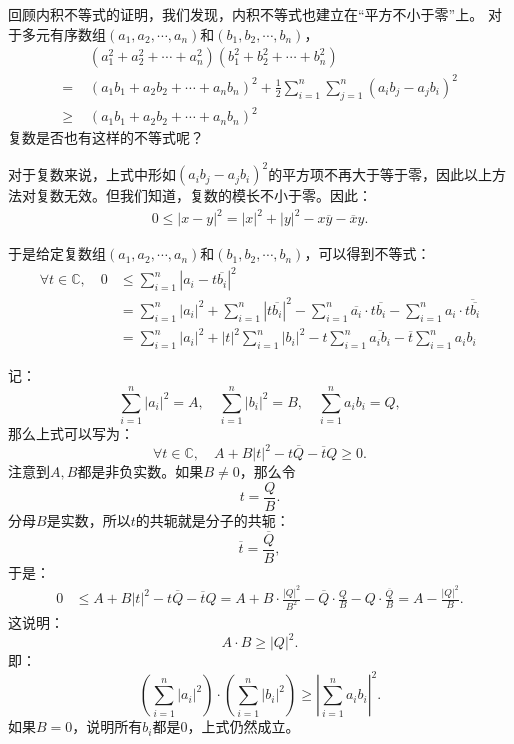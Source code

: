 \documentclass[12pt,UTF8,fontset=none]{ctexbook}
\begin{document}
\begin{appendix}
回顾内积不等式的证明，我们发现，内积不等式也建立在“平方不小于零”上。
对于多元有序数组$(a_1, a_2, \cdots, a_n)$和$(b_1, b_2, \cdots, b_n)$，
\begin{align*}
    &(a_1^2 + a_2^2 + \cdots + a_n^2)(b_1^2 + b_2^2 + \cdots + b_n^2)  \\
    =\,\,& (a_1b_1 + a_2b_2 + \cdots + a_nb_n)^2 + \frac{1}{2}\sum_{i=1}^n\sum_{j=1}^n(a_ib_j - a_jb_i)^2  \\
    \geqslant\,\,& (a_1b_1 + a_2b_2 + \cdots + a_nb_n)^2  
\end{align*}
复数是否也有这样的不等式呢？

对于复数来说，上式中形如$(a_ib_j - a_jb_i)^2$的平方项不再大于等于零，因此以上方法对复数无效。但我们知道，复数的模长不小于零。因此：
\begin{align*}
    0 \leqslant |x - y|^2 = |x|^2 + |y|^2 - x\overline{y} - \overline{x} y.
\end{align*}

于是给定复数组$(a_1, a_2, \cdots, a_n)$和$(b_1, b_2, \cdots, b_n)$，可以得到不等式：
\begin{align*}
    \forall t \in \mathbb{C}, \quad 0 &\leqslant \sum_{i=1}^n |a_i - t\overline{b_i}|^2 \\
    &= \sum_{i=1}^n |a_i|^2 + \sum_{i=1}^n |t \overline{b_i}|^2 - \sum_{i=1}^n \overline{a_i} \cdot t\overline{b_i} - \sum_{i=1}^n a_i \cdot \overline{t \overline{b_i}} \\
    &= \sum_{i=1}^n |a_i|^2 + |t|^2 \sum_{i=1}^n |b_i|^2 - t\sum_{i=1}^n \overline{a_ib_i} - \overline{t}\sum_{i=1}^n a_ib_i
\end{align*}

记：
$$ \sum_{i=1}^n |a_i|^2 = A, \quad \sum_{i=1}^n |b_i|^2 = B, \quad \sum_{i=1}^n a_ib_i = Q, $$
那么上式可以写为：
$$ \forall t \in \mathbb{C}, \quad A + B |t|^2 - t\overline{Q} - \overline{t}Q \geqslant 0. $$
注意到$A,B$都是非负实数。如果$ B \neq 0$，那么令
$$ t = \frac{Q}{B}. $$
分母$B$是实数，所以$t$的共轭就是分子的共轭：
$$\overline{t} = \frac{\overline{Q}}{B}, $$
于是：
\begin{align*}
    0 &\leqslant A + B |t|^2 - t\overline{Q} - \overline{t}Q = A + B \cdot \frac{|Q|^2}{B^2} - \overline{Q}\cdot \frac{Q}{B} - Q\cdot \frac{\overline{Q}}{B} = A - \frac{|Q|^2}{B}.
\end{align*}
这说明：
$$ A \cdot B \geqslant |Q|^2.$$
即：
$$ \left(\sum_{i=1}^n |a_i|^2\right)\cdot\left(\sum_{i=1}^n |b_i|^2\right)\geqslant \left|\sum_{i=1}^n a_ib_i\right|^2. $$
如果$B = 0$，说明所有$b_i$都是$0$，上式仍然成立。


\end{appendix}
\end{document}
